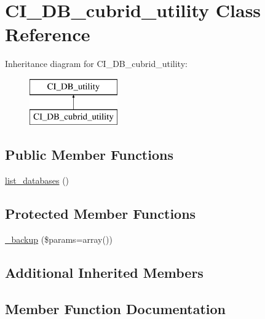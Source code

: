 \hypertarget{class_c_i___d_b__cubrid__utility}{}\section{C\+I\+\_\+\+D\+B\+\_\+cubrid\+\_\+utility Class Reference}
\label{class_c_i___d_b__cubrid__utility}
Inheritance diagram for C\+I\+\_\+\+D\+B\+\_\+cubrid\+\_\+utility\+:\begin{figure}[H]
\begin{center}
\leavevmode
\includegraphics[height=2.000000cm]{class_c_i___d_b__cubrid__utility}
\end{center}
\end{figure}
\subsection*{Public Member Functions}
\begin{DoxyCompactItemize}
\item 
\mbox{\hyperlink{class_c_i___d_b__cubrid__utility_a8486b247a8868504b055622cb2dd34d3}{list\+\_\+databases}} ()
\end{DoxyCompactItemize}
\subsection*{Protected Member Functions}
\begin{DoxyCompactItemize}
\item 
\mbox{\hyperlink{class_c_i___d_b__cubrid__utility_a30f3053d2c82e7562349924363507afa}{\+\_\+backup}} (\$params=array())
\end{DoxyCompactItemize}
\subsection*{Additional Inherited Members}


\subsection{Member Function Documentation}
\mbox{\label{class_c_i___d_b__cubrid__utility_a30f3053d2c82e7562349924363507afa}} 
